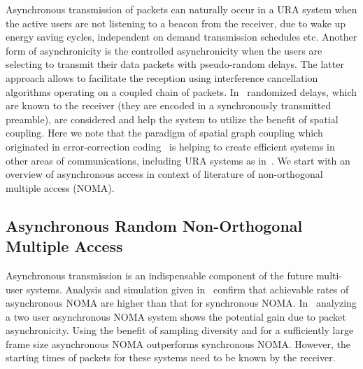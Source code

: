 \documentclass[journal,onecolumn,12pt]{IEEEtran}
\begin{document}
Asynchronous transmission of packets can naturally occur in a URA system when the active users are not listening to a beacon from the receiver, due to wake up energy saving cycles, independent on demand transmission schedules etc. Another form of asynchronicity is the controlled asynchronicity when the users are selecting to transmit their data packets with pseudo-random delays. The latter approach allows to facilitate the reception using interference cancellation algorithms operating on a coupled chain of packets. In~\cite{TBKN20} randomized delays, which are known to the receiver (they are encoded in a synchronously transmitted preamble), are considered and help the system to utilize the benefit of spatial coupling. Here we note that the paradigm of spatial graph coupling which originated in error-correction coding~\cite{FZ99} is helping to create efficient systems in other areas of communications, including URA systems as in~\cite{TBKN20}.
We start with an overview of asynchronous access in context of literature of non-orthogonal multiple access (NOMA).

\subsection{Asynchronous Random Non-Orthogonal Multiple Access}

Asynchronous transmission is an indispensable component of the future multi-user systems. Analysis and simulation given in~\cite{LWYYBK21} confirm that achievable rates of asynchronous NOMA are higher than that for synchronous NOMA. In~\cite{ZHJ19} analyzing a two user asynchronous NOMA system shows the potential gain due to packet asynchronicity. Using the benefit of sampling diversity and for a sufficiently large frame size asynchronous NOMA outperforms synchronous NOMA. However, the starting times of packets for these systems need to be known by the receiver.
\end{document}
